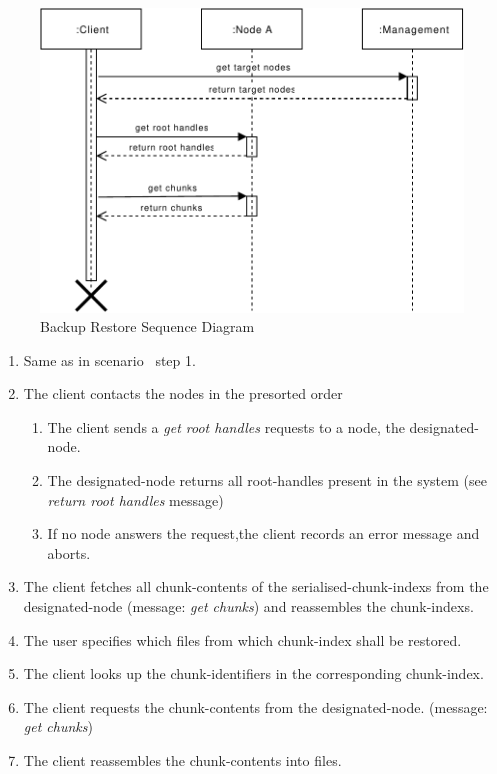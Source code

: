 \begin{figure}[h]
    \centering
    \includegraphics[width=\linewidth]{resources/backup_restore.pdf}
    \caption{Backup Restore Sequence Diagram}
    \label{fig:backup-restore}
\end{figure}

\begin{enumerate}
    \item Same as in scenario~ step 1.
    \item The \gls{client} contacts the \glspl{node} in the presorted order
        \begin{enumerate}
            \item The \gls{client} sends a \emph{get root handles} requests to a \gls{node}, the \gls{designated-node}.
            \item The \gls{designated-node} returns all \glspl{root-handle} present in the system (see \emph{return root handles} message)
            \item If no \gls{node} answers the request,the \gls{client} records an error message and aborts.
        \end{enumerate}
    \item The \gls{client} fetches all \glspl{chunk-content} of the \glspl{serialised-chunk-index} from the \gls{designated-node} (message: \emph{get chunks}) and reassembles the \glspl{chunk-index}.
    \item The \gls{user} specifies which \glspl{file} from which \gls{chunk-index} shall be restored.
    \item The \gls{client} looks up the \glspl{chunk-identifier} in the corresponding \gls{chunk-index}.
    \item The \gls{client} requests the \glspl{chunk-content} from the \gls{designated-node}. (message: \emph{get chunks})
    \item The \gls{client} reassembles the \glspl{chunk-content} into \glspl{file}.
\end{enumerate}

